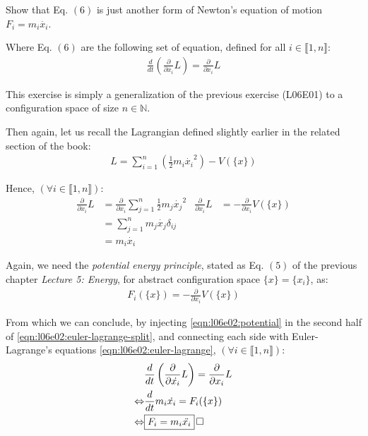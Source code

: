 \documentclass[solutions.tex]{subfiles}
\begin{document}
\maketitle
\begin{exercise}
Show that Eq. $(6)$ is just another form of Newton's
equation of motion $F_i = m_i \ddot{x_i}$.
\end{exercise}
Where Eq. $(6)$ are the following set of equation, defined for
all $i\in\llbracket 1, n\rrbracket$:
\begin{align}
	\frac{d}{dt}\left(\frac{\partial}{\partial\dot{x_i}}L\right)
		= \frac{\partial}{\partial x_i}L
	\label{eqn:l06e02:euler-lagrange}
\end{align}

\begin{remark} This exercise is simply a generalization
of the previous exercise (L06E01) to a configuration space
of size $n\in\mathbb{N}$.
\end{remark}

Then again, let us recall the Lagrangian defined slightly earlier
in the related section of the book:
\begin{align}
	L = \sum_{i=1}^n\left(\frac{1}{2}m_i\dot{x_i}^2\right)-V(\{x\})
	\label{eqn:l06e02:lagrangian}
\end{align}

Hence, $(\forall i \in\llbracket 1, n\rrbracket)$:
\begin{align}
	\frac{\partial}{\partial\dot{x_i}}L &=
		\frac{\partial}{\partial\dot{x_i}}
			\sum_{j=1}^n\frac{1}{2}m_j\dot{x_j}^2
	& \frac{\partial}{\partial x_i}L &= -\frac{\partial}{\partial x_i}V(\{x\})
		\nonumber \\
	~ &= \sum_{j=1}^n m_j \dot{x_j}\delta_{ij} & ~ & ~\nonumber \\
	~ &= m_i \dot{x_i} & ~ & ~
	\label{eqn:l06e02:euler-lagrange-split}
\end{align}

Again, we need the \textit{potential energy principle}, stated
as Eq. $(5)$ of the previous chapter \textit{Lecture 5: Energy},
for abstract configuration space $\{x\} = \{x_i\}$, as:
\begin{align}
	F_i(\{x\}) = -\frac{\partial}{\partial x_i}V(\{x\})
	\label{eqn:l06e02:potential}
\end{align}

From which we can conclude, by injecting \eqref{eqn:l06e02:potential}
in the second half of \eqref{eqn:l06e02:euler-lagrange-split}, and
connecting each side with Euler-Lagrange's equations
\eqref{eqn:l06e02:euler-lagrange}, $(\forall i \in\llbracket 1, n\rrbracket)$:
\begin{align*}
	~ & \frac{d}{dt}\left(\frac{\partial}{\partial\dot{x_i}}L\right)
		= \frac{\partial}{\partial x_i}L \\
	\Leftrightarrow & \frac{d}{dt}m_i \dot{x_i} = F_i(\{x\}) \\
	\Leftrightarrow & \boxed{F_i = m_i \ddot{x_i}} \qed
\end{align*}
\end{document}
